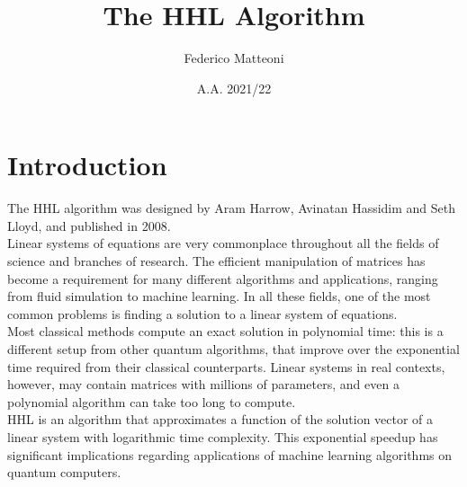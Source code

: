 \documentclass[10pt]{article}
\begin{document}
\title{The HHL Algorithm}
\author{Federico Matteoni}
\date{A.A. 2021/22}
\maketitle
\section{Introduction}
The HHL algorithm was designed by Aram Harrow, Avinatan Hassidim and Seth Lloyd, and published in 2008.\\
Linear systems of equations are very commonplace throughout all the fields of science and branches of research. The efficient manipulation of matrices has become a requirement for many different algorithms and applications, ranging from fluid simulation to machine learning. In all these fields, one of the most common problems is finding a solution to a linear system of equations.\\
Most classical methods compute an exact solution in polynomial time: this is a different setup from other quantum algorithms, that improve over the exponential time required from their classical counterparts. Linear systems in real contexts, however, may contain matrices with millions of parameters, and even a polynomial algorithm can take too long to compute.\\
HHL is an algorithm that approximates a function of the solution vector of a linear system with logarithmic time complexity. This exponential speedup has significant implications regarding applications of machine learning algorithms on quantum computers.
\end{document}
